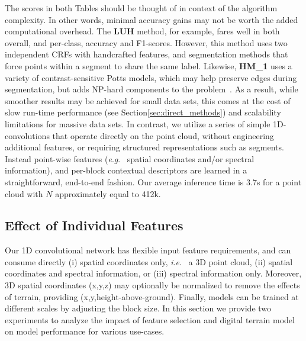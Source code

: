 \documentclass[final,3p,times,twocolumn,authoryear]{elsarticle}
\newcommand{\ie}{\textit{i}.\textit{e}.}
\newcommand{\eg}{\textit{e}.\textit{g}.}
\begin{document}
The scores in both Tables should be thought of in context of the algorithm complexity. 
In other words, minimal accuracy gains may not be worth the added computational overhead. 
The {\bf LUH} method, for example, fares well in both overall, and per-class, accuracy and F1-scores. 
However, this method uses two independent CRFs with handcrafted features, and segmentation methods that force points within a segment to share the same label. Likewise, {\bf HM\_1} uses a variety of contrast-sensitive Potts models, which may help preserve edges during segmentation, but adds NP-hard components to the problem~\citep{potts_model_2001}. As a result, while smoother results may be achieved for small data sets, this comes at the cost of slow run-time performance (see Section\ref{sec:direct_methods}) and scalability limitations for massive data sets. 
In contrast, we utilize a series of simple 1D-convolutions that operate directly on the point cloud, without engineering additional features, or requiring structured representations such as segments. 
Instead point-wise features (\eg~ spatial coordinates and/or spectral information), and per-block contextual descriptors are learned in a straightforward, end-to-end fashion. Our average inference time is 3.7s for a point cloud with $N$ approximately equal to 412k. %





\subsection{Effect of Individual Features}
\label{sec:effect_of_individual_features}
Our 1D convolutional network has flexible input feature requirements, and can consume directly (i) spatial coordinates only, \ie~ a 3D point cloud, (ii) spatial coordinates and spectral information, or (iii) spectral information only. %
Moreover, 3D spatial coordinates (x,y,z) may optionally be normalized to remove the effects of terrain, providing (x,y,height-above-ground). 
Finally, models can be trained at different scales by adjusting the block size. 
In this section we provide two experiments to analyze the impact of feature selection and digital terrain model on model performance for various use-cases. 
\end{document}
